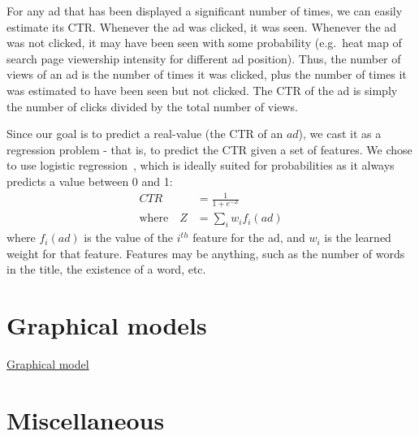 \documentclass{book}
\begin{document}
For any ad that has been displayed a significant number of times, we can easily estimate its CTR. Whenever the ad was clicked, it was seen. Whenever the ad was not clicked, it may have been seen with some probability (e.g.\ heat map of search page viewership intensity for different ad position). Thus, the number of views of an ad is the number of times it was clicked, plus the number of times it was estimated to have been seen but not clicked. The CTR of the ad is simply the number of clicks divided by the total number of views.


Since our goal is to predict a real-value (the CTR of an $ad$), we cast it as a regression problem - that is, to predict the CTR given a set of features. We chose to use logistic regression~\cite{DBLP:conf/www/RichardsonDR07}, which is ideally suited for probabilities as it always predicts a value between 0 and 1:
\begin{align*}
CTR &= \frac{1}{1+e^{-Z}} \\
\mbox{where} \quad Z &= \sum_i w_i f_i(ad)
\end{align*}
where $f_i(ad)$ is the value of the $i^{th}$ feature for the ad, and $w_i$ is the learned weight for that feature. Features may be anything, such as the number of words in the title, the existence of a word, etc.

\chapter{Graphical models}
\href{https://medium.com/@neerajsharma_28983/intuitive-guide-to-probability-graphical-models-be81150da7a}{Graphical model}


\chapter{Miscellaneous} 
\end{document}
